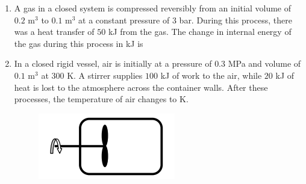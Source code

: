 \documentclass[a4paper,10pt]{article}
\begin{document}
\begin{enumerate}
    \item A gas in a closed system is compressed reversibly from an initial volume of $0.2$ m$^3$ to $0.1$ m$^3$ at a constant pressure of $3$ bar. During this process, there was a heat transfer of $50$ kJ from the gas. The change in internal energy of the gas during this process in kJ is
    
    \hfill{}
    \begin{enumerate}[label=\Alph*)]
    \end{enumerate}

    \item In a closed rigid vessel, air is initially at a pressure of $0.3$ MPa and volume of $0.1$ m$^3$ at $300$ K. A stirrer supplies $100$ kJ of work to the air, while $20$ kJ of heat is lost to the atmosphere across the container walls. After these processes, the temperature of air changes to \underline{\hspace{2cm}} K.
    \begin{figure}[H] \centering \includegraphics[width=0.4\columnwidth]{q11_thermo.png} \caption*{} \label{fig:q11_thermo} \end{figure}
    
    \hfill{}
    \begin{enumerate}[label=\Alph*)]
    \end{enumerate}


\end{enumerate}
\end{document}
